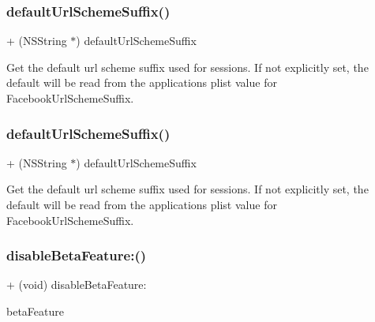 \subsubsection{\texorpdfstring{default\+Url\+Scheme\+Suffix()}{defaultUrlSchemeSuffix()}\hspace{0.1cm}{\footnotesize\ttfamily [4/5]}}
{\footnotesize\ttfamily + (N\+S\+String $\ast$) default\+Url\+Scheme\+Suffix \begin{DoxyParamCaption}{ }\end{DoxyParamCaption}}

Get the default url scheme suffix used for sessions. If not explicitly set, the default will be read from the application\textquotesingle{}s plist value for \textquotesingle{}Facebook\+Url\+Scheme\+Suffix\textquotesingle{}. \mbox{\label{interfaceFBSettings_ae7709bddfea2d7cf28ad5e91f769dc9b}} 
\subsubsection{\texorpdfstring{default\+Url\+Scheme\+Suffix()}{defaultUrlSchemeSuffix()}\hspace{0.1cm}{\footnotesize\ttfamily [5/5]}}
{\footnotesize\ttfamily + (N\+S\+String $\ast$) default\+Url\+Scheme\+Suffix \begin{DoxyParamCaption}{ }\end{DoxyParamCaption}}

Get the default url scheme suffix used for sessions. If not explicitly set, the default will be read from the application\textquotesingle{}s plist value for \textquotesingle{}Facebook\+Url\+Scheme\+Suffix\textquotesingle{}. \mbox{\label{interfaceFBSettings_a6cc67de9d4b0069de4bfc6a3872f7114}} 
\subsubsection{\texorpdfstring{disable\+Beta\+Feature\+:()}{disableBetaFeature:()}\hspace{0.1cm}{\footnotesize\ttfamily [1/5]}}
{\footnotesize\ttfamily + (void) disable\+Beta\+Feature\+: \begin{DoxyParamCaption}\item[{(F\+B\+Beta\+Features)}]{beta\+Feature }\end{DoxyParamCaption}}

